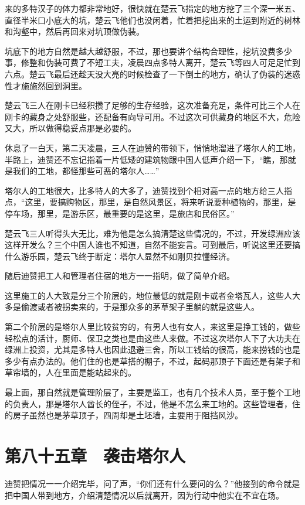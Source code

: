 来的多特汉子的体力都非常地好，很快就在楚云飞指定的地方挖了三个深一米五、直径半米口小底大的坑，楚云飞他们也没闲着，忙着把挖出来的土运到附近的树林和沟壑中，然后再回来对坑顶做伪装。

坑底下的地方自然是越大越舒服，不过，那也要讲个结构合理性，挖坑没费多少事，修整和伪装可费了不短工夫，凌晨四点多特人离开，楚云飞等四人可足足忙到六点。楚云飞最后还趁天没大亮的时候检查了一下倒土的地方，确认了伪装的迷惑性才施施然回到洞里。

楚云飞三人在刚卡已经积攒了足够的生存经验，这次准备充足，条件可比三个人在刚卡的藏身之处舒服些，还配备有向导可用。不过这次可供藏身的地区不大，危险又大，所以做得稳妥点那是必要的。

休息了一白天，第二天凌晨，三人在迪赞的带领下，悄悄地溜进了塔尔人的工地，半路上，迪赞还不忘记指着一片低矮的建筑物跟中国人低声介绍一下，“瞧，那就是我们的工地，都怪那些可恶的塔尔人……”

塔尔人的工地很大，比多特人的大多了，迪赞找到个相对高一点的地方给三人指点，“这里，要搞购物区，那里，是自然风景区，将来听说要种植物的，那里，是停车场，那里，是游乐区，最重要的是这里，是旅店和民俗区。”

楚云飞三人听得头大无比，难为他是怎么搞清楚这些情况的，不过，开发绿洲应该这样开发么？三个中国人谁也不知道，自然不能妄言。可到最后，听说这里还要搞什么游乐园，楚云飞终于断定：塔尔人显然不如刚贝拉懂经济。

随后迪赞把工人和管理者住宿的地方一一指明，做了简单介绍。

这里施工的人大致是分三个阶层的，地位最低的就是刚卡或者金塔瓦人，这些人大多是偷渡或者被拐卖来的，于是那众多的茅草架子里躺的就是这些人。

第二个阶层的是塔尔人里比较贫穷的，有男人也有女人，来这里是挣工钱的，做些轻松点的活计，厨师、保卫之类也是由这些人来做。不过这次塔尔人下了大功夫在绿洲上投资，尤其是多特人也因此退避三舍，所以工钱给的很高，能来捞钱的也是多少有点办法的。他们住的也是草搭的棚子，不过，起码那顶子下面还是有架子和草帘墙的，人在里面是能站起来的。

最上面，那自然就是管理阶层了，主要是监工，也有几个技术人员，至于整个工地的负责人，那是塔尔人酋长的侄子，不过，他是不怎么来工地的。这些管理者，住的房子虽然也是茅草顶子，四周却是土坯墙，主要用于阻挡风沙。

\section{第八十五章　袭击塔尔人}

迪赞把情况一一介绍完毕，问了声，“你们还有什么要问的么？”他接到的命令就是把中国人带到地方，介绍清楚情况以后就离开，因为行动中他实在不宜在场。

